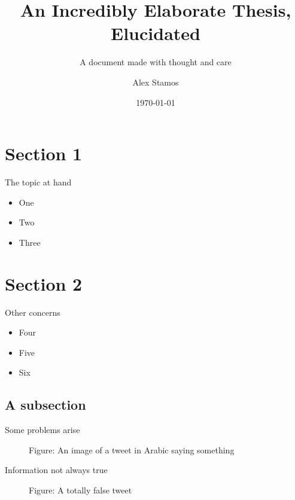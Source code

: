 \documentclass[nobackground,dvipsnames,table]{beamer}
\title[Elaborate Thesis]{An Incredibly Elaborate Thesis, Elucidated}
\subtitle{A document made with thought and care}
\author[A. Stamos]{Alex Stamos}
\institute[SIO]{\large Stanford Internet Observatory}
\date[2022]{\today}
\begin{document}
\coverpage

\begin{frame}
    \titlepage
\end{frame}

\section{Section 1}

\begin{frame}{The topic at hand}
    \begin{itemize}
        \item One
        \item Two
        \item Three
    \end{itemize}
\end{frame}

\section{Section 2}

\begin{frame}{Other concerns}
    \begin{itemize}
        \item Four
        \item Five
        \item Six
    \end{itemize}
\end{frame}

\subsection{A subsection}

\begin{frame}{Some problems arise}
    \begin{figure}[ht]
        \center
        {Figure: An image of a tweet in Arabic saying something}
    \end{figure}
\end{frame}

\begin{frame}{Information not always true }
    \begin{figure}[ht]
        \center
        {Figure: A totally false tweet}
    \end{figure}
\end{frame}


\backpage
\end{document}
